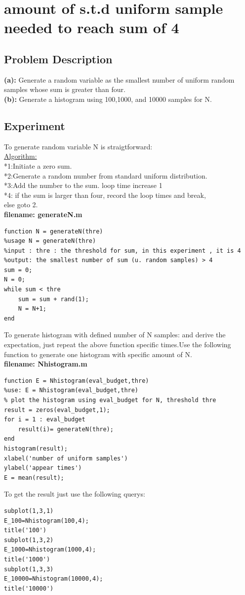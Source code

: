 \documentclass[twoside]{article}
\begin{document}
\section{amount of s.t.d uniform sample needed to reach sum of 4}
\subsection{\normalsize{Problem Description}}
\noindent \textbf {(a):} Generate a  random variable as the smallest number of uniform random samples whose sum is greater than four.\\
\noindent \textbf {(b):} Generate a histogram using 100,1000, and 10000 samples for N.
\subsection{\normalsize{Experiment}}
To generate random variable N is straigtforward:\\[10pt]
\underline{Algorithm:}\\[10pt]
*1:Initiate a zero sum.\\
*2:Generate a random number from standard uniform distribution. \\
*3:Add the number to the sum. loop time increase 1\\
*4: if the sum is larger than four, record the loop times and break,\\
    else goto 2.\\[10pt]
\noindent \textbf {filename: generateN.m}\\
\begin{lstlisting}
function N = generateN(thre)
%usage N = generateN(thre)
%input : thre : the threshold for sum, in this experiment , it is 4
%output: the smallest number of sum (u. random samples) > 4
sum = 0;
N = 0;
while sum < thre
    sum = sum + rand(1);
    N = N+1;
end
\end{lstlisting}
To generate histogram with defined number of N samples: and derive the expectation, just repeat the above function specific times.Use the following function to generate one histogram with specific amount of N.\\[10pt]
\noindent \textbf {filename: Nhistogram.m}\\
\begin{lstlisting}
function E = Nhistogram(eval_budget,thre)
%use: E = Nhistogram(eval_budget,thre)
% plot the histogram using eval_budget for N, threshold thre
result = zeros(eval_budget,1);
for i = 1 : eval_budget
    result(i)= generateN(thre);
end
histogram(result);
xlabel('number of uniform samples')
ylabel('appear times')
E = mean(result);
\end{lstlisting}
To get the result just use the following querys:\\
\begin{lstlisting}
subplot(1,3,1)
E_100=Nhistogram(100,4);
title('100')
subplot(1,3,2)
E_1000=Nhistogram(1000,4);
title('1000')
subplot(1,3,3)
E_10000=Nhistogram(10000,4);
title('10000')
\end{lstlisting}
\end{document}
